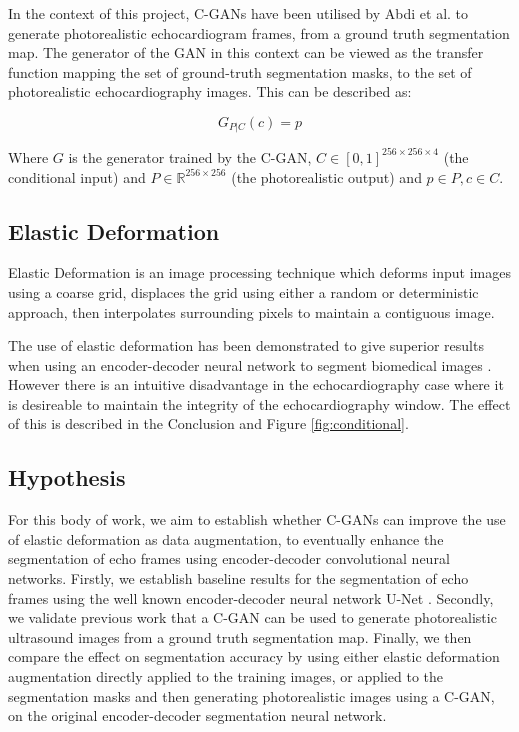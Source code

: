In the context of this project, C-GANs have been utilised by Abdi et al.
\cite{abdiGANenhancedConditionalEchocardiogram2019} to generate photorealistic
echocardiogram frames, from a ground truth segmentation map. The generator of
the GAN in this context can be viewed as the transfer function mapping the set
of ground-truth segmentation masks, to the set of photorealistic
echocardiography images. This can be described as: \newline

\begin{equation}
    G_{P|C}(c) = p
\end{equation} \newline

Where $G$ is the generator trained by the C-GAN, $C \in
[0,1]^{256\times256\times4}$ (the conditional input) and $P \in
\mathbb{R}^{256\times256}$ (the photorealistic output) and $p \in P, c \in
C$.\newline 

\subsection{Elastic Deformation}

Elastic Deformation is an image processing technique which deforms input images
using a coarse grid, displaces the grid using either a random or deterministic
approach, then interpolates surrounding pixels to maintain a contiguous image.
\newline

The use of elastic deformation has been demonstrated to give superior results
when using an encoder-decoder neural network to segment biomedical images
\cite{ronneberger2015u}. However there is an intuitive disadvantage in the
echocardiography case where it is desireable to maintain the integrity of the
echocardiography window. The effect of this is described in the Conclusion and Figure
\ref{fig:conditional}. \newline

\subsection{Hypothesis}

For this body of work, we aim to establish whether C-GANs can improve the use of
elastic deformation as data augmentation, to eventually enhance the segmentation
of echo frames using encoder-decoder convolutional neural networks. Firstly, we
establish baseline results for the segmentation of echo frames using the well known
encoder-decoder neural network U-Net \cite{ronneberger2015u}. Secondly, we
validate previous work that a C-GAN can be used to generate photorealistic
ultrasound images from a ground truth segmentation map. Finally, we then compare
the effect on segmentation accuracy by using either elastic deformation
augmentation directly applied to the training images, or applied to the
segmentation masks and then generating photorealistic images using a C-GAN, on
the original encoder-decoder segmentation neural network. \newline